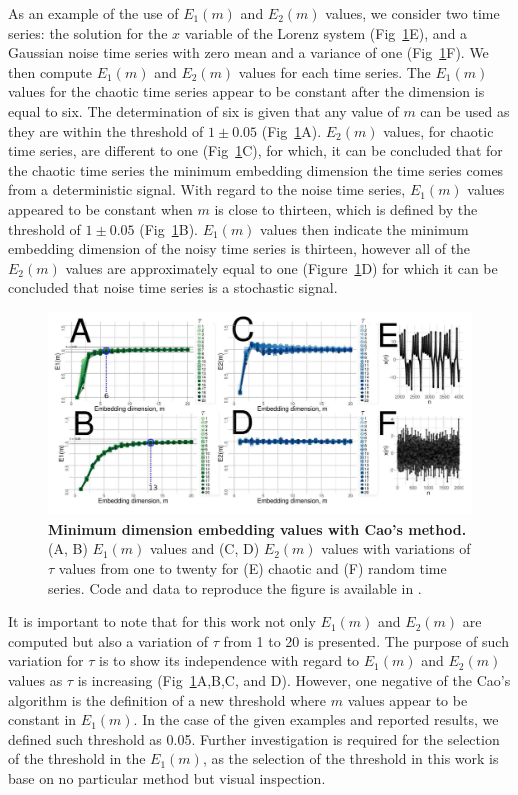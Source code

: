 \documentclass[fleqn,10pt]{wlscirep}
\begin{document}
As an example of the use of $E_1(m)$ and $E_2(m)$ values, we consider two time 
series: the solution for the $x$ variable of the Lorenz system 
(Fig~\ref{fig:e1e2}E), and a Gaussian noise time series with zero mean 
and a variance of one (Fig~\ref{fig:e1e2}F).
We then compute $E_1(m)$ and $E_2(m)$ values for each time series.
The $E_1(m)$ values for the chaotic time series appear to be constant
after the dimension is equal to six.
The determination of six is given that any value of $m$ can be used as they 
are within the threshold of $1\pm0.05$ (Fig~\ref{fig:e1e2}A).
$E_2(m)$ values, for chaotic time series, are different to one 
(Fig~\ref{fig:e1e2}C), for which, it can be concluded that for the 
chaotic time series the minimum embedding dimension the time series 
comes from a deterministic signal. With regard to the noise time series,  
$E_1(m)$ values appeared to be constant when $m$ is close to thirteen, 
which is defined by the threshold of $1\pm0.05$ (Fig~\ref{fig:e1e2}B).
$E_1(m)$ values then indicate the minimum embedding dimension of the 
noisy time series is thirteen, however all of the $E_2(m)$ values are 
approximately equal to one (Figure~\ref{fig:e1e2}D) for which it can be 
concluded that noise time series is a stochastic signal.
\begin{figure}[ht]
\centering
\includegraphics[width=1.0\textwidth]{cao.pdf}
    \caption{
	{\bf Minimum dimension embedding values with Cao's method.} 
	(A, B) $E_1 (m)$ values and (C, D) $E_2(m)$ values 
	with variations of $\tau$ values from one to twenty
	for (E) chaotic and (F) random time series.
	Code and data to reproduce the figure is available in \cite{srep2020}.
        }
    \label{fig:e1e2}
\end{figure}

It is important to note that for this work not only $E_1(m)$ and $E_2(m)$ are 
computed but also a variation of $\tau$ from 1 to 20 is presented. 
The purpose of such variation for $\tau$ is to show its independence with
regard to $E_1(m)$ and $E_2(m)$ values as $\tau$ is increasing 
(Fig~\ref{fig:e1e2}A,B,C, and D). 
However, one negative of the Cao's algorithm \cite{Cao1997} is the definition of 
a new threshold where $m$ values appear to be constant in $E_1 (m)$.
In the case of the given examples and reported results, we defined such 
threshold as 0.05. Further investigation is required for the selection of the 
threshold in the $E_1(m)$, as the selection of the threshold in this work is 
base on no particular method but visual inspection.
\end{document}
